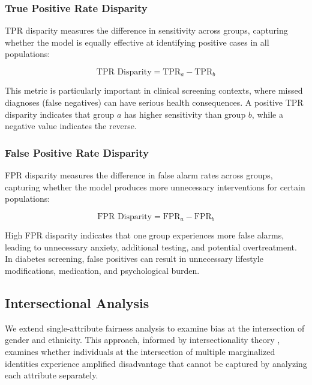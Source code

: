 \subsubsection{True Positive Rate Disparity}

TPR disparity measures the difference in sensitivity across groups, 
capturing whether the model is equally effective at identifying positive 
cases in all populations:

\begin{equation}
\text{TPR Disparity} = \text{TPR}_a - \text{TPR}_b
\label{eq:tpr_disparity}
\end{equation}

This metric is particularly important in clinical screening contexts, 
where missed diagnoses (false negatives) can have serious health 
consequences. A positive TPR disparity indicates that group $a$ has 
higher sensitivity than group $b$, while a negative value indicates 
the reverse.

\subsubsection{False Positive Rate Disparity}

FPR disparity measures the difference in false alarm rates across groups, 
capturing whether the model produces more unnecessary interventions for 
certain populations:

\begin{equation}
\text{FPR Disparity} = \text{FPR}_a - \text{FPR}_b
\label{eq:fpr_disparity}
\end{equation}

High FPR disparity indicates that one group experiences more false alarms, 
leading to unnecessary anxiety, additional testing, and potential 
overtreatment. In diabetes screening, false positives can result in 
unnecessary lifestyle modifications, medication, and psychological burden.

\subsection{Intersectional Analysis}

We extend single-attribute fairness analysis to examine bias at the 
intersection of gender and ethnicity. This approach, informed by 
intersectionality theory \cite{crenshaw1989}, examines whether individuals 
at the intersection of multiple marginalized identities experience 
amplified disadvantage that cannot be captured by analyzing each attribute 
separately.

